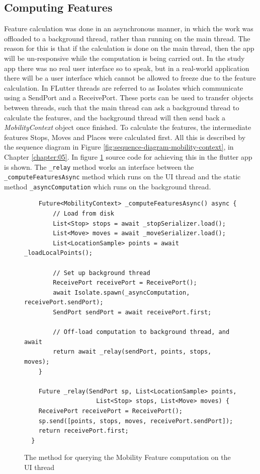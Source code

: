 \subsection{Computing Features}
Feature calculation was done in an asynchronous manner, in which the work was offloaded to a background thread, rather than running on the main thread. The reason for this is that if the calculation is done on the main thread, then the app will be un-responsive while the computation is being carried out. In the study app there was no real user interface so to speak, but in a real-world application there will be a user interface which cannot be allowed to freeze due to the feature calculation. In FLutter threads are referred to as Isolates which communicate using a SendPort and a ReceivePort. These ports can be used to transfer objects between threads, such that the main thread can ask a background thread to calculate the features, and the background thread will then send back a \textit{MobilityContext} object once finished. To calculate the features, the intermediate features Stops, Moves and Places were calculated first. All this is described by the sequence diagram in Figure \ref{fig:sequence-diagram-mobility-context}, in Chapter \ref{chapter:05}. In figure \ref{fig:feature-comutation-code} source code for achieving this in the flutter app is shown. The \verb|_relay| method works an interface between the \verb|_computeFeaturesAsync| method which runs on the UI thread and the static method \verb|_asyncComputation| which runs on the background thread.


\begin{figure}
    \centering
    \begin{verbatim}
    Future<MobilityContext> _computeFeaturesAsync() async {
        // Load from disk
        List<Stop> stops = await _stopSerializer.load();
        List<Move> moves = await _moveSerializer.load();
        List<LocationSample> points = await _loadLocalPoints();
        
        // Set up background thread
        ReceivePort receivePort = ReceivePort();
        await Isolate.spawn(_asyncComputation, receivePort.sendPort);
        SendPort sendPort = await receivePort.first;
        
        // Off-load computation to background thread, and await
        return await _relay(sendPort, points, stops, moves);
    }
    
    Future _relay(SendPort sp, List<LocationSample> points, 
                    List<Stop> stops, List<Move> moves) {
    ReceivePort receivePort = ReceivePort();
    sp.send([points, stops, moves, receivePort.sendPort]);
    return receivePort.first;
  }
    \end{verbatim}
    \caption{The method for querying the Mobility Feature computation on the UI thread}
    \label{fig:feature-comutation-code}
\end{figure}


